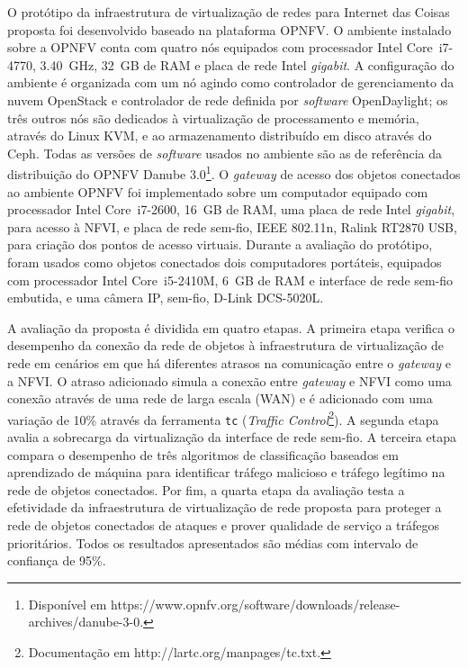 \documentclass[12pt]{article}
\begin{document}
O protótipo da infraestrutura de virtualização de redes para Internet das Coisas proposta foi desenvolvido baseado na plataforma OPNFV. O ambiente instalado sobre a OPNFV conta com quatro nós equipados com processador Intel Core~i7-4770, 3.40~GHz, 32~GB de RAM e placa de rede Intel \textit{gigabit}. A configuração do ambiente é organizada com um nó agindo como controlador de gerenciamento da nuvem OpenStack e controlador de rede definida por \textit{software} OpenDaylight;
 os três outros nós são dedicados à virtualização de processamento e memória, através do Linux KVM,
 e ao armazenamento distribuído em disco através do Ceph.
Todas as versões de \textit{software} usados no ambiente são as de referência da distribuição do OPNFV Danube 3.0\footnote{Disponível em https://www.opnfv.org/software/downloads/release-archives/danube-3-0.}. O \textit{gateway} de acesso dos objetos conectados ao ambiente OPNFV foi implementado sobre um computador equipado com processador Intel Core~i7-2600, 16~GB de RAM, uma placa de rede Intel \textit{gigabit}, para acesso à NFVI, e placa de rede sem-fio, IEEE 802.11n, Ralink RT2870 USB, para criação dos pontos de acesso virtuais. Durante a avaliação do protótipo, foram usados como objetos conectados dois computadores portáteis, equipados com processador Intel Core~i5-2410M, 6~GB de RAM e interface de rede sem-fio embutida, e uma câmera IP, sem-fio, D-Link DCS-5020L.

A avaliação da proposta é dividida em quatro etapas. A primeira etapa verifica o desempenho da conexão da rede de objetos à infraestrutura de virtualização de rede em cenários em que há diferentes atrasos na comunicação entre o \textit{gateway} e a NFVI. O atraso adicionado simula a conexão entre \textit{gateway} e NFVI como uma conexão através de uma rede de larga escala (WAN) e é adicionado com uma variação de 10\% através da ferramenta \texttt{tc} (\textit{Traffic Control}\footnote{Documentação em http://lartc.org/manpages/tc.txt.}). A segunda etapa avalia a sobrecarga da virtualização da interface de rede sem-fio. A terceira etapa compara o desempenho de três algoritmos de classificação baseados em aprendizado de máquina para identificar tráfego malicioso e tráfego legítimo na rede de objetos conectados. Por fim, a quarta etapa da avaliação testa a efetividade da infraestrutura de virtualização de rede proposta para proteger a rede de objetos conectados de ataques e prover qualidade de serviço a tráfegos prioritários. Todos os resultados apresentados são médias com intervalo de confiança de 95\%.
\end{document}

